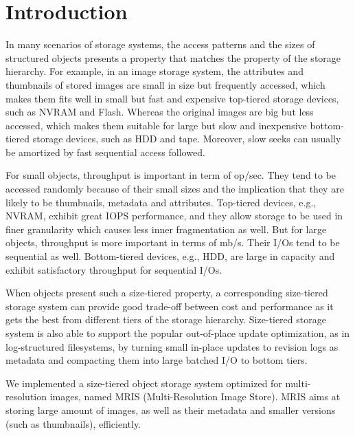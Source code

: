 \section{Introduction}
\label{intro}

In many scenarios of storage systems, the access patterns and the
sizes of structured objects presents a property that matches the
property of the storage hierarchy. For example, in an image storage
system, the attributes and thumbnails of stored images are small in
size but frequently accessed, which makes them fits well in small but
fast and expensive top-tiered storage devices, such as NVRAM and
Flash.  Whereas the original images are big but less accessed, which
makes them suitable for large but slow and inexpensive bottom-tiered
storage devices, such as HDD and tape.  Moreover, slow seeks can
usually be amortized by fast sequential access followed.

For small objects, throughput is important in term of op/sec. They
tend to be accessed randomly because of their small sizes and the
implication that they are likely to be thumbnails, metadata and
attributes.  Top-tiered devices, e.g., NVRAM, exhibit great IOPS
performance, and they allow storage to be used in finer granularity
which causes less inner fragmentation as well. But for large objects,
throughput is more important in terms of mb/s. Their I/Os tend to be
sequential as well. Bottom-tiered devices, e.g., HDD, are large in
capacity and exhibit satisfactory throughput for sequential I/Os. 

When objects present such a size-tiered property, a corresponding
size-tiered storage system can provide good trade-off between cost and
performance as it gets the best from different tiers of the storage
hierarchy. Size-tiered storage system is also able to support the
popular out-of-place update optimization, as in log-structured
filesystems, by turning small in-place updates to revision logs as
metadata and compacting them into large batched I/O to bottom tiers.

We implemented a size-tiered object storage system optimized for
multi-resolution images, named MRIS (Multi-Resolution Image Store).
MRIS aims at storing large amount of images, as well as their metadata
and smaller versions (such as thumbnails), efficiently. 


